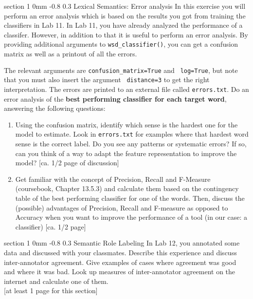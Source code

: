 \documentclass[11pt]{article}
\makeatletter
\newcommand{\newsec}[1]{\section{#1}\noindent}
\renewcommand{\section}{\@startsection
{section}%
{1}%
{0mm}%
{-0.8\baselineskip}%
{0.3\baselineskip}%
{\bfseries\large}}%
\makeatother
\begin{document}
\newsec{Lexical Semantics: Error analysis}%
In this exercise you will perform an error analysis which is based on
the results you got from training the classifiers in Lab 11.  In Lab
11, you have already analyzed the performance of a classifer. However,
in addition to that it is useful to perform an error analysis. By
providing additional arguments to {\tt wsd\_classifier()}, you can get
a confusion matrix as well as a printout of all the errors.
\begin{center}
\fbox{
\scalebox{0.55}{

}}
\end{center}
The relevant arguments are {\tt confusion\_matrix=True} and {\tt
  log=True}, but note that you must also insert the argument {\tt
  distance=3} to get the right interpretation. The errors are printed
to an external file called {\tt errors.txt}. Do an error analysis of
the \textbf{best performing classifier for each target word}, answering the
following questions:
\begin{enumerate}
\item Using the confusion matrix, identify which sense is the hardest
  one for the model to estimate. Look in {\tt errors.txt} for examples
  where that hardest word sense is the correct label.  Do you see any
  patterns or systematic errors? If so, can you think of a way to
  adapt the feature representation to improve the model?
  \textcolor{UUred}{[ca. 1/2 page of discussion]}
\item Get familiar with the concept of Precision, Recall and F-Measure
  (coursebook, Chapter 13.5.3) and calculate them based on the
  contingency table of the best performing classifier for one of the
  words. Then, discuss the (possible) advantages of Precision, Recall
  and F-measure as opposed to Accuracy when you want to improve the
  performance of a tool (in our case: a classifier)
  \textcolor{UUred}{[ca. 1/2 page]}
\end{enumerate}


\newsec{Semantic Role Labeling}%
In Lab 12, you annotated some data and discussed with your classmates.
Describe this experience and discuss inter-annotator agreement.  Give
examples of cases where agreement was good and where it was bad.  Look
up measures of inter-annotator agreement on the internet and calculate
one of them. \\\textcolor{UUred}{[at least 1 page for this section]}
\end{document}
